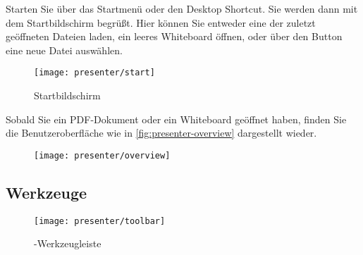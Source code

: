 Starten Sie \lectPresenter{} über das Startmenü oder den Desktop Shortcut. Sie werden dann mit dem Startbildschirm begrüßt. Hier können Sie entweder eine der zuletzt geöffneten Dateien laden, ein leeres Whiteboard öffnen, oder über den Button  eine neue Datei auswählen.

\begin{figure}[H]
	\texttt{[image: presenter/start]}
	\caption{Startbildschirm}
	\label{fig:presenter-start}
\end{figure}

Sobald Sie ein PDF-Dokument oder ein Whiteboard geöffnet haben, finden Sie die Benutzeroberfläche wie in \autoref{fig:presenter-overview} dargestellt wieder.

\begin{figure}[H]
	\texttt{[image: presenter/overview]}
	\caption{\lectPresenter{}}
	\label{fig:presenter-overview}
\end{figure}

\subsection{Werkzeuge}
\label{section:presenter:toolbar}

\begin{figure}[H]
	\texttt{[image: presenter/toolbar]}
	\caption{\lectPresenter{}-Werkzeugleiste}
	\label{fig:presenter-toolbar}
\end{figure}

